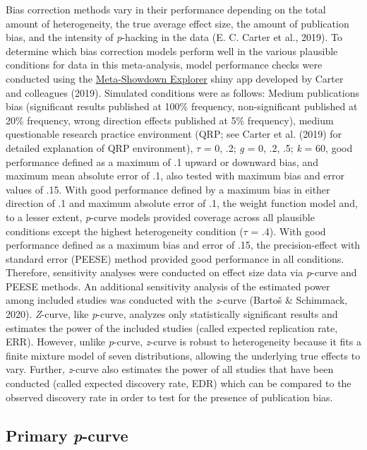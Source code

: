 \documentclass[
  english,
  man, donotrepeattitle,floatsintext]{apa7}
\begin{document}
Bias correction methods vary in their performance depending on the total amount of heterogeneity, the true average effect size, the amount of publication bias, and the intensity of \emph{p}-hacking in the data (E. C. Carter et al., 2019). To determine which bias correction models perform well in the various plausible conditions for data in this meta-analysis, model performance checks were conducted using the \href{http://www.shinyapps.org/apps/metaExplorer/}{Meta-Showdown Explorer} shiny app developed by Carter and colleagues (2019). Simulated conditions were as follows: Medium publications bias (significant results published at 100\% frequency, non-significant published at 20\% frequency, wrong direction effects published at 5\% frequency), medium questionable research practice environment (QRP; see Carter et al. (2019) for detailed explanation of QRP environment), \(\tau\) = 0, .2; \emph{g} = 0, .2, .5; \emph{k} = 60, good performance defined as a maximum of .1 upward or downward bias, and maximum mean absolute error of .1, also tested with maximum bias and error values of .15. With good performance defined by a maximum bias in either direction of .1 and maximum absolute error of .1, the weight function model and, to a lesser extent, \emph{p}-curve models provided coverage across all plausible conditions except the highest heterogeneity condition (\(\tau\) = .4). With good performance defined as a maximum bias and error of .15, the precision-effect with standard error (PEESE) method provided good performance in all conditions. Therefore, sensitivity analyses were conducted on effect size data via \emph{p}-curve and PEESE methods. An additional sensitivity analysis of the estimated power among included studies was conducted with the \emph{z}-curve (Bartoš \& Schimmack, 2020). \emph{Z}-curve, like \emph{p}-curve, analyzes only statistically significant results and estimates the power of the included studies (called expected replication rate, ERR). However, unlike \emph{p}-curve, \emph{z}-curve is robust to heterogeneity because it fits a finite mixture model of seven distributions, allowing the underlying true effects to vary. Further, \emph{z}-curve also estimates the power of all studies that have been conducted (called expected discovery rate, EDR) which can be compared to the observed discovery rate in order to test for the presence of publication bias.

\hypertarget{primary-p-curve}{%
\subsection{\texorpdfstring{Primary \emph{p}-curve}{Primary p-curve}}\label{primary-p-curve}}
\end{document}

